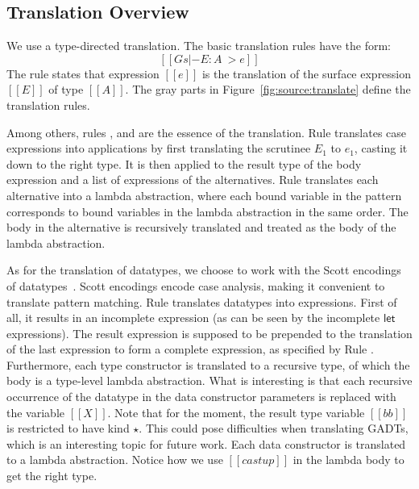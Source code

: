 
\subsection{Translation Overview}

We use a type-directed translation. The basic translation rules have the form:
\[
[[Gs  |- E : A ~> e]]
\]
The rule states that \name expression $[[e]]$ is the translation of the
surface expression $[[E]]$ of type $[[A]]$.  The gray parts in
Figure~\ref{fig:source:translate} define the translation
rules. 

Among others, rules ,  and
 are the essence of the translation. Rule
 translates case expressions into applications by
first translating the scrutinee $E_1$ to $e_1$, casting it down to the
right type. It is then applied to the result type of the body
expression and a list of \name expressions of the alternatives. Rule
 translates each alternative into a lambda
abstraction, where each bound variable in the pattern corresponds to
bound variables in the lambda abstraction in the same order. The body
in the alternative is recursively translated and treated as the body
of the lambda abstraction. %

As for the translation of datatypes, we choose to work with the Scott
encodings of datatypes~\cite{encoding:scott}. Scott encodings encode
case analysis, making it convenient to translate pattern
matching. Rule  translates datatypes into \name
expressions. First of all, it results in an incomplete expression (as
can be seen by the incomplete $\mathsf{let}$ expressions). The result
expression is supposed to be prepended to the translation of the last
expression to form a complete \name expression, as specified by Rule
. Furthermore, each type constructor is translated
to a recursive type, of which the body is a type-level lambda
abstraction. What is interesting is that each recursive occurrence of
the datatype in the data constructor parameters is replaced with the
variable $[[X]]$. Note that for the moment, the result type variable
$[[bb]]$ is restricted to have kind $\star$. This could pose
difficulties when translating GADTs, which is an interesting topic for
future work. Each data constructor is translated to a lambda
abstraction. Notice how we use $[[castup]]$ in the lambda body to get
the right type.

